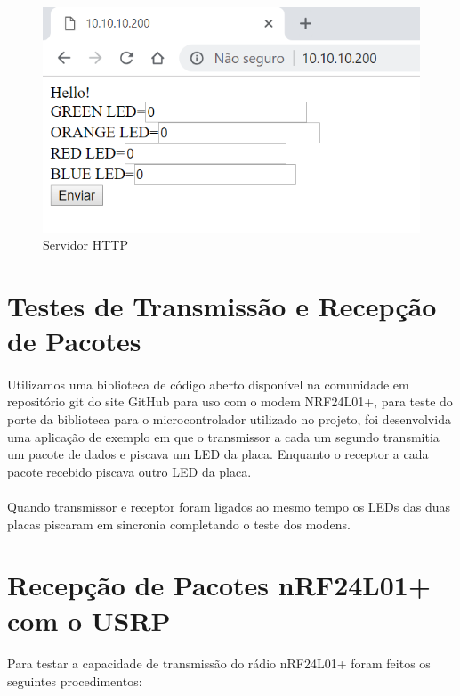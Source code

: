 \FloatBarrier
\begin{figure}[!htp]
\centering
\includegraphics[scale = 0.8]{Figuras/httpServer.PNG}
\caption{Servidor HTTP}
\label{fig:figura150}
\end{figure}
\FloatBarrier

\section{Testes de Transmissão e Recepção de Pacotes}

\paragraph{} Utilizamos uma biblioteca de código aberto disponível na comunidade em repositório git do site GitHub \citep{gitnrf}  para uso com o modem NRF24L01+, para teste do porte da biblioteca para o microcontrolador utilizado no projeto, foi desenvolvida uma aplicação de exemplo em que o transmissor a cada um segundo transmitia um pacote de dados e piscava um LED da placa. Enquanto o receptor a cada pacote recebido piscava outro LED da placa.

\paragraph{} Quando transmissor e receptor foram ligados ao mesmo tempo os LEDs das duas placas piscaram em sincronia completando o teste dos modens. 


\section{Recepção de Pacotes nRF24L01+ com o USRP}
\paragraph{} Para testar a capacidade de transmissão do rádio nRF24L01+ foram feitos os seguintes procedimentos: 

